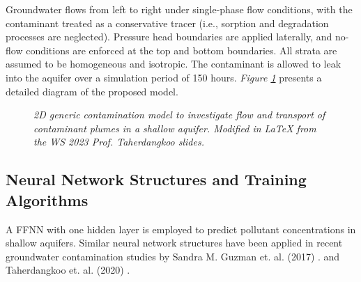 \documentclass[10pt]{article}
\begin{document}
	Groundwater flows from left to right under single-phase flow conditions, with the contaminant treated as a conservative tracer (i.e., sorption and degradation processes are neglected). Pressure head boundaries are applied laterally, and no-flow conditions are enforced at the top and bottom boundaries. All strata are assumed to be homogeneous and isotropic.
	The contaminant is allowed to leak into the aquifer over a simulation period of 150 hours. \textit{Figure \ref{fig:contamination_model}} presents a detailed diagram of the proposed model.
	
	\begin{figure}[h]
		\centering
		\caption{\textit{2D generic contamination model to investigate flow and transport of contaminant plumes in a shallow aquifer. Modified in \LaTeX{} from the WS 2023 Prof. Taherdangkoo slides.}}
		\label{fig:contamination_model}
	\end{figure}
	
	\subsection{Neural Network Structures and Training Algorithms}
	
	A FFNN with one hidden layer is employed to predict pollutant concentrations in shallow aquifers. Similar neural network structures have been applied in recent groundwater contamination studies by Sandra M. Guzman et. al. (2017) \cite{guzman2017}. and Taherdangkoo et. al. (2020) \cite{taherdangkoo2020}. 
	
\end{document}
